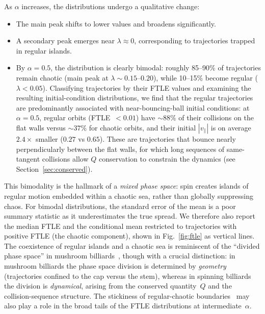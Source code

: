 \documentclass[aps,prd,twocolumn,superscriptaddress,nofootinbib,floatfix]{revtex4-2}
\begin{document}
\noindent
As $\alpha$ increases, the distributions undergo a qualitative change:
\begin{itemize}
    \item The main peak shifts to lower values and broadens significantly.
    \item A secondary peak emerges near $\lambda\approx 0$, corresponding to trajectories trapped in regular islands.
    \item By $\alpha = 0.5$, the distribution is clearly bimodal: roughly 85--90\% of trajectories remain chaotic (main peak at $\lambda \sim 0.15$--$0.20$), while 10--15\% become regular ($\lambda < 0.05$). Classifying trajectories by their FTLE values and examining the resulting initial-condition distributions, we find that the regular trajectories are predominantly associated with near-bouncing-ball initial conditions: at $\alpha = 0.5$, regular orbits (FTLE~$< 0.01$) have $\sim\!88\%$ of their collisions on the flat walls versus $\sim\!37\%$ for chaotic orbits, and their initial $|v_\parallel|$ is on average $2.4\times$ smaller ($0.27$ vs $0.65$). These are trajectories that bounce nearly perpendicularly between the flat walls, for which long sequences of same-tangent collisions allow $Q$ conservation to constrain the dynamics (see Section~\ref{sec:conserved}).
\end{itemize}

\noindent
This bimodality is the hallmark of a \emph{mixed phase space}: spin creates islands of regular motion embedded within a chaotic sea, rather than globally suppressing chaos. For bimodal distributions, the standard error of the mean is a poor summary statistic as it underestimates the true spread. We therefore also report the median FTLE and the conditional mean restricted to trajectories with positive FTLE (the chaotic component), shown in Fig.~\ref{fig:ftle} as vertical lines. The coexistence of regular islands and a chaotic sea is reminiscent of the ``divided phase space'' in mushroom billiards~\cite{bunimovich2001}, though with a crucial distinction: in mushroom billiards the phase space division is determined by \emph{geometry} (trajectories confined to the cap versus the stem), whereas in spinning billiards the division is \emph{dynamical}, arising from the conserved quantity~$Q$ and the collision-sequence structure. The stickiness of regular-chaotic boundaries~\cite{altmann2005} may also play a role in the broad tails of the FTLE distributions at intermediate~$\alpha$.\\
\end{document}
